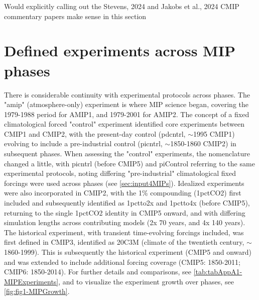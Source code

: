\documentclass[gmd, preprint]{copernicus}
\def\cred#1{{\color{red}#1}}
\begin{document}
\cred{Would explicitly calling out the Stevens, 2024 and Jakobs et al., 2024 CMIP commentary papers make sense in this section}








\appendix
\section{Defined experiments across MIP phases}    %
\label{sec:secAppA1-MIPExperiments}
There is considerable continuity with experimental protocols across phases. The "amip" (atmosphere-only) experiment is where MIP science began, covering the 1979-1988 period for AMIP1, and 1979-2001 for AMIP2. The concept of a fixed climatological forced "control" experiment identified core experiments between CMIP1 and CMIP2, with the present-day control (pdcntrl, $\sim$1995 CMIP1) evolving to include a pre-industrial control (picntrl, $\sim$1850-1860 CMIP2) in subsequent phases. When assessing the "control" experiments, the nomenclature changed a little, with picntrl (before CMIP5) and piControl referring to the same experimental protocols, noting differing "pre-industrial" climatological fixed forcings were used across phases (see \autoref{sec:input4MIPs}). Idealized experiments were also incorporated in CMIP2, with the 1\% compounding (1pctCO2) first included and subsequently identified as 1pctto2x and 1pctto4x (before CMIP5), returning to the single 1pctCO2 identity in CMIP5 onward, and with differing simulation lengths across contributing models (2x 70 years, and 4x 140 years). The historical experiment, with transient time-evolving forcings included, was first defined in CMIP3, identified as 20C3M (climate of the twentieth century, $\sim$1860-1999). This is subsequently the historical experiment (CMIP5 and onward) and was extended to include additional forcing coverage (CMIP5: 1850-2011; CMIP6: 1850-2014). For further details and comparisons, see \autoref{tab:tabAppA1-MIPExperiments}, and to visualize the experiment growth over phases, see \autoref{fig:fig1-MIPGrowth}.
\end{document}
